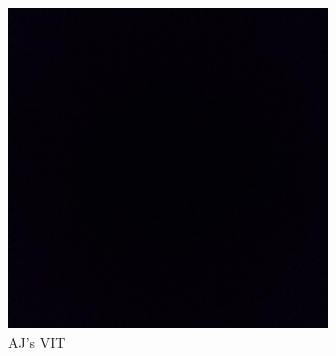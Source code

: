 \clearpage
\begin{figure}
    \centering
    \includegraphics[height=.5\pdfpageheight]{figures/blackbox.jpeg}
    \caption{AJ's VIT}
    \label{fig:SpectralViTDiag}
\end{figure}

